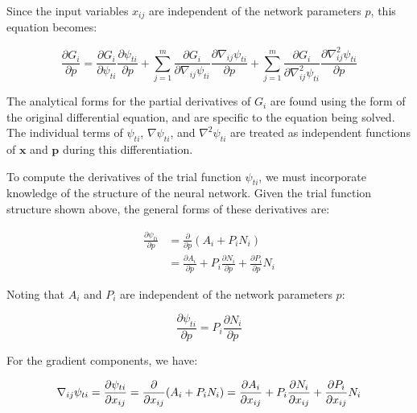\documentclass{article}
\begin{document}
\noindent Since the input variables $x_{ij}$ are independent of the network parameters $p$, this equation becomes:

\begin{equation}
  \frac {\partial G_i} {\partial p} = \frac {\partial G_i} {\partial \psi_{ti}} \frac {\partial \psi_{ti}} {\partial p} + \sum_{j=1}^m \frac {\partial G_i} {\partial \nabla_{ij} \psi_{ti}} \frac {\partial \nabla_{ij} \psi_{ti}} {\partial p} + \sum_{j=1}^m \frac {\partial G_i} {\partial \nabla_{ij}^2 \psi_{ti}} \frac {\partial \nabla_{ij}^2 \psi_{ti}} {\partial p}
\end{equation}

\noindent The analytical forms for the partial derivatives of $G_i$ are found using the form of the original differential equation, and are specific to the equation being solved. The individual terms of $\psi_{ti}$, $\nabla \psi_{ti}$, and $\nabla^2 \psi_{ti}$ are treated as independent functions of $\mathbf x$ and $\mathbf p$  during this differentiation.

To compute the derivatives of the trial function $\psi_{ti}$, we must incorporate knowledge of the structure of the neural network. Given the trial function structure shown above, the general forms of these derivatives are:

\begin{align}
  \frac {\partial \psi_{ti}} {\partial p} &= \frac {\partial} {\partial p} \left( A_i + P_i N_i \right) \\
  &= \frac {\partial A_i} {\partial p} + P_i \frac {\partial N_i} {\partial p} + \frac {\partial P_i} {\partial p} N_i
\end{align}

\noindent Noting that $A_i$ and $P_i$ are independent of the network parameters $p$:

\begin{equation}
  \frac {\partial \psi_{ti}} {\partial p} = P_i \frac {\partial N_i} {\partial p}
\end{equation}

For the gradient components, we have:

\begin{equation}
  \nabla_{ij} \psi_{ti} = \frac {\partial \psi_{ti}} {\partial x_{ij}} \\
  = \frac {\partial} {\partial x_{ij}} (A_i + P_i N_i) \\
  = \frac {\partial A_i} {\partial x_{ij}} + P_i \frac {\partial N_i} {\partial x_{ij}} + \frac {\partial P_i} {\partial x_{ij}} N_i
\end{equation}
\end{document}
